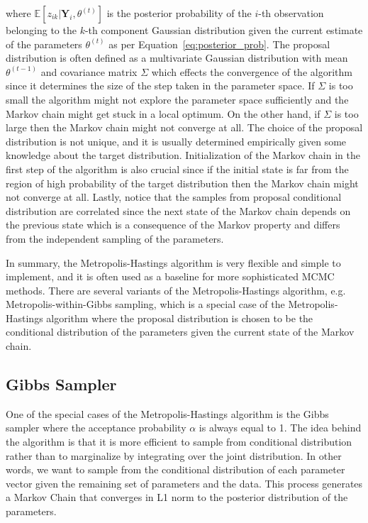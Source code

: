 where $\mathbb{E}[z_{ik}|\textbf{Y}_i,\theta^{(t)}]$ is the posterior probability of the $i$-th observation belonging to the $k$-th component Gaussian distribution given the current estimate of the parameters $\theta^{(t)}$ as per Equation~\ref{eq:posterior_prob}.
The proposal distribution is often defined as a multivariate Gaussian distribution with mean $\theta^{(t-1)}$ and covariance matrix $\Sigma$ which effects the convergence of the algorithm since it determines the size of the step taken in the parameter space. 
If $\Sigma$ is too small the algorithm might not explore the parameter space sufficiently and the Markov chain might get stuck in a local optimum. On the other hand, if $\Sigma$ is too large then the Markov chain might not converge at all. 
The choice of the proposal distribution is not unique, and it is usually determined empirically given some knowledge about the target distribution. 
Initialization of the Markov chain in the first step of the algorithm is also crucial since if the initial state is far from the region of high probability of the target distribution then the Markov chain might not converge at all.
Lastly, notice that the samples from proposal conditional distribution are correlated since the next state of the Markov chain depends on the previous state which is a consequence of the Markov property and differs from the independent sampling of the parameters.

In summary, the Metropolis-Hastings algorithm is very flexible and simple to implement, and it is often used as a baseline for more sophisticated MCMC methods. 
There are several variants of the Metropolis-Hastings algorithm, e.g. Metropolis-within-Gibbs sampling, which is a special case of the Metropolis-Hastings algorithm where the proposal distribution is chosen to be the conditional distribution of the parameters given the current state of the Markov chain.

\subsection{Gibbs Sampler}

One of the special cases of the Metropolis-Hastings algorithm is the Gibbs sampler where the acceptance probability 
$\alpha$ is always equal to 1. The idea behind the algorithm is that it is more efficient to sample from conditional distribution rather than 
to marginalize by integrating over the joint distribution. In other words, we want to sample from the conditional distribution of each parameter vector given 
the remaining set of parameters and the data. This process generates a Markov Chain that converges in L1 norm to the posterior distribution of the parameters. \citep{Chib1996}

